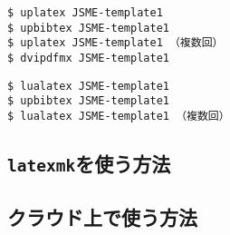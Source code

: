 \begin{tcolorbox}[enhanced, title=\upLaTeX$+$\upBibTeX, drop fuzzy shadow]
\begin{verbatim}
$ uplatex JSME-template1
$ upbibtex JSME-template1
$ uplatex JSME-template1 （複数回）
$ dvipdfmx JSME-template1
\end{verbatim}
\end{tcolorbox}

\begin{tcolorbox}[enhanced, title=\LuaLaTeX$+$\upBibTeX, drop fuzzy shadow]
\begin{verbatim}
$ lualatex JSME-template1
$ upbibtex JSME-template1
$ lualatex JSME-template1 （複数回）
\end{verbatim}
\end{tcolorbox}


\subsection{\texttt{latexmk}を使う方法}
\label{ssec:latexmk}

\lipsum[1-8]

\subsection{クラウド上で使う方法}
\label{ssec:cloud}


\lipsum[1-4]

